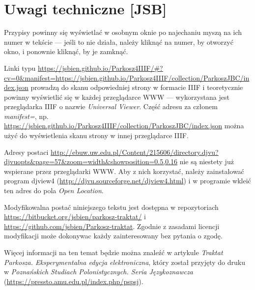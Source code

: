 \documentclass[dvipsnames,12pt]{report}
\begin{document}
\section*{Uwagi techniczne [JSB]}
\label{sec:Uwagi techniczne}

{

Przypisy powinny się wyświetlać w osobnym oknie po najechaniu myszą na
ich numer w tekście --- jeśli to nie działa, należy kliknąć na
numer, by otworzyć okno, i ponownie kliknąć, by je zamknąć.

\break Linki typu
\url{https://jsbien.github.io/Parkosz4IIIF/\#?cv=0&manifest=https://jsbien.github.io/Parkosz4IIIF/collection/ParkoszJBC/index.json}
prowadzą do skanu odpowiedniej strony w formacie IIIF i teoretycznie
powinny wyświetlić się w każdej przeglądarce WWW --- wykorzystana jest
przeglądarka IIIF o nazwie \textit{Universal Viewer}. Część adresu
za członem \textit{manifest=}, np.
\url{https://jsbien.github.io/Parkosz4IIIF/collection/ParkoszJBC/index.json}
można użyć do wyświetlenia skanu strony w innej przeglądarce IIIF.

Adresy postaci
\url{http://ebuw.uw.edu.pl/Content/215606/directory.djvu?djvuopts&page=57&zoom=width&showposition=0.5,0.16}
nie są niestety już wspierane przez przeglądarki WWW. Aby z nich
korzystać, należy zainstalować program \textsf{djview4}
(\url{http://djvu.sourceforge.net/djview4.html}) i w programie wkleić
  ten adres do pola \textit{Open Location}.

  Modyfikowalna postać niniejszego tekstu jest dostępna w
  repozytoriach \url{https://bitbucket.org/jsbien/parkosz-traktat/} i
  \url{https://github.com/jsbien/Parkosz-traktat}. Zgodnie z zasadami
  licencji modyfikacji może dokonywac każdy zainteresowany bez pytania
  o zgodę.

  Więcej informacji na ten temat będzie można znaleźć w artykule
  \textit{Traktat Parkosza. Eksperymentalna edycja elektroniczna},
  który został przyjęty do druku w \textit{Poznańskich Studiach
    Polonistycznych. Seria Językoznawcza}
  (\url{https://pressto.amu.edu.pl/index.php/pspsj}).
}  
\newpage
{}
{}
{}
 
 \newpage
{}
\end{document}
